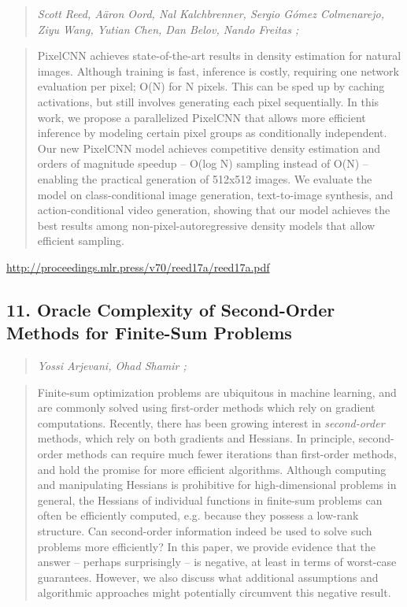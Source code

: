 \documentclass{article}
\begin{document}
\begin{quote}
\footnotesize{\textit{Scott Reed, Aäron Oord, Nal Kalchbrenner, Sergio Gómez Colmenarejo, Ziyu Wang, Yutian Chen, Dan Belov, Nando Freitas ;}}
\end{quote}

\begin{quote}
    PixelCNN achieves state-of-the-art results in density estimation for natural images. Although training is fast, inference is costly, requiring one network evaluation per pixel; O(N) for N pixels. This can be sped up by caching activations, but still involves generating each pixel sequentially. In this work, we propose a parallelized PixelCNN that allows more efficient inference by modeling certain pixel groups as conditionally independent. Our new PixelCNN model achieves competitive density estimation and orders of magnitude speedup – O(log N) sampling instead of O(N) – enabling the practical generation of 512x512 images. We evaluate the model on class-conditional image generation, text-to-image synthesis, and action-conditional video generation, showing that our model achieves the best results among non-pixel-autoregressive density models that allow efficient sampling.  \end{quote}

\href{http://proceedings.mlr.press/v70/reed17a/reed17a.pdf}{http://proceedings.mlr.press/v70/reed17a/reed17a.pdf}

\subsection{11. Oracle Complexity of Second-Order Methods for Finite-Sum Problems}

\begin{quote}
\footnotesize{\textit{Yossi Arjevani, Ohad Shamir ;}}
\end{quote}

\begin{quote}
    Finite-sum optimization problems are ubiquitous in machine learning, and are commonly solved using first-order methods which rely on gradient computations. Recently, there has been growing interest in \textit{second-order} methods, which rely on both gradients and Hessians. In principle, second-order methods can require much fewer iterations than first-order methods, and hold the promise for more efficient algorithms. Although computing and manipulating Hessians is prohibitive for high-dimensional problems in general, the Hessians of individual functions in finite-sum problems can often be efficiently computed, e.g. because they possess a low-rank structure. Can second-order information indeed be used to solve such problems more efficiently? In this paper, we provide evidence that the answer – perhaps surprisingly – is negative, at least in terms of worst-case guarantees. However, we also discuss what additional assumptions and algorithmic approaches might potentially circumvent this negative result.  \end{quote}
\end{document}
